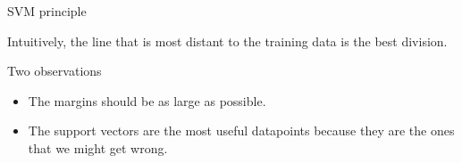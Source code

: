 \documentclass[compress,xcolor=table]{beamer}
\begin{document}
\begin{frame}{SVM principle}
\begin{center}
{{\begin{tikzpicture}[>=latex]
            \end{tikzpicture}
        }
        }
    \end{center}

 {

Intuitively, the line that is most distant to the training data is the
best division.


}
 {
Two observations

\begin{itemize}

\item The margins should be as large as possible.
\item The support vectors are the most useful datapoints because they are
  the ones that we might get wrong.
\end{itemize}

}

\end{frame}
\end{document}
